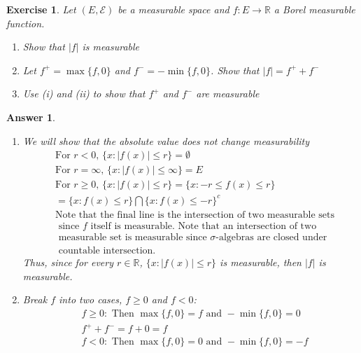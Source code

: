 \documentclass[12pt]{article}
\theoremstyle{colon}
\newtheorem{exercise}{Exercise}
\newtheorem*{answer}{Answer}
\begin{document}
\clearpage

\begin{exercise}
  Let $(E, \mathcal{E})$ be a measurable space and $f: E \rightarrow \mathbb{R}$ a Borel measurable function.
  \begin{enumerate}[label=(\roman*)]
    \item Show that $|f|$ is measurable
    \item Let $f^+ = \max \{f, 0\}$ and $f^- = -\min \{f, 0\}$. Show that $|f| = f^+ + f^-$
    \item Use (i) and (ii) to show that $f^+$ and $f^-$ are measurable
  \end{enumerate}
\end{exercise}

\begin{answer}
  \leavevmode
  \begin{enumerate}[label=(\roman*)]
    \item We will show that the absolute value does not change measurability
      \begin{align*}
        &\text{For $r < 0$, } \{ x: |f(x)| \leq r\} = \emptyset \\
        &\text{For $r = \infty$, }\{ x: |f(x)| \leq \infty\} = E \\
        &\text{For $r \geq 0$, } \{ x: |f(x)| \leq r\} = \{ x: -r \leq f(x) \leq r\} \\
        &= \{ x: f(x) \leq r\} \bigcap \{ x: f(x) \leq -r\}^c \\
        &\text{Note that the final line is the intersection of two measurable sets} \\
        &\text{ since $f$ itself is measurable. Note that an intersection of two } \\
        &\text{ measurable set is measurable since $\sigma$-algebras are closed under } \\
        &\text{ countable intersection.}
      \end{align*}
      Thus, since for every $r \in \mathbb{R}$, $\{ x: |f(x)| \leq r\}$ is measurable, then $|f|$ is measurable.
    \item Break $f$ into two cases, $f \geq 0$ and $f < 0$:
      \begin{align*}
        &f \geq 0: \text{ Then } \max\{f, 0\} = f \text{ and } -\min\{f,0\} = 0 \\
        &f^+ + f^- = f + 0 = f \\
        &f < 0: \text{ Then } \max\{f, 0\} = 0 \text{ and } -\min\{f,0\} = -f \\

\end{align*}
\end{enumerate}
\end{answer}
\end{document}
